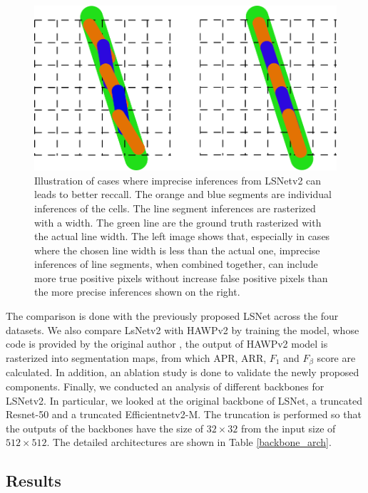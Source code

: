 \documentclass[journal]{IEEEtran}
\begin{document}
\begin{figure}
  \includegraphics[width=\linewidth]{imgs/others/why_f_beta.png}
  \caption{Illustration of cases where imprecise inferences from LSNetv2 can leads to better reccall. The orange and blue segments are individual inferences of the cells. The line segment inferences are rasterized with a width. The green line are the ground truth rasterized with the actual line width. The left image shows that, especially in cases where the chosen line width is less than the actual one, imprecise inferences of line segments, when combined together, can include more true positive pixels without increase false positive pixels than the more precise inferences shown on the right.}
  \label{hirecall}
\end{figure}

The comparison is done with the previously proposed LSNet across the four datasets. We also compare LsNetv2 with HAWPv2 by training the model, whose code is provided by the original author \cite{hawpv2code}, the output of HAWPv2 model is rasterized into segmentation maps, from which APR, ARR, $F_1$ and $F_\beta$ score are calculated. In addition, an ablation study is done to validate the newly proposed components. Finally, we conducted an analysis of different backbones for LSNetv2. In particular, we looked at the original backbone of LSNet, a truncated Resnet-50 \cite{resnet} and a truncated Efficientnetv2-M\cite{efficientnetv2}. The truncation is performed so that the outputs of the backbones have the size of $32 \times 32$ from the input size of $512 \times 512$. The detailed architectures are shown in Table \ref{backbone_arch}.

\subsection{Results}
\end{document}
